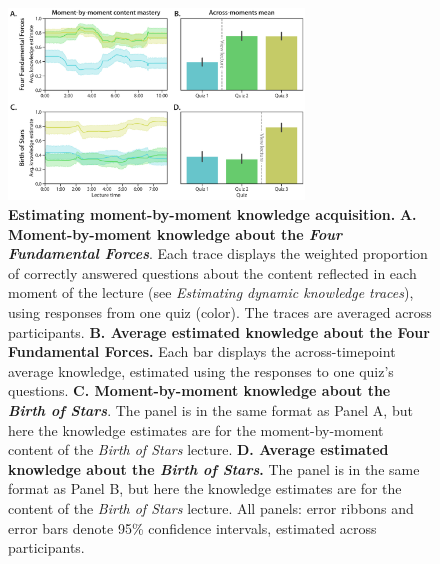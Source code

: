 \documentclass[10pt]{article}
\begin{document}
\begin{figure}[tp]
    \centering
    \includegraphics[width=0.7\textwidth]{figs/content-mastery}

    \caption{\textbf{Estimating moment-by-moment knowledge acquisition.}
    \textbf{A. Moment-by-moment knowledge about the \textit{Four Fundamental
    Forces}}. Each trace displays the weighted proportion of correctly answered
    questions about the content reflected in each moment of the lecture (see
    \textit{Estimating dynamic knowledge traces}), using responses from one
    quiz (color). The traces are averaged across participants. \textbf{B.
    Average estimated knowledge about the \textbf{Four Fundamental Forces}.}
    Each bar displays the across-timepoint average knowledge, estimated using
    the responses to one quiz's questions. \textbf{C. Moment-by-moment
    knowledge about the \textit{Birth of Stars}}. The panel is in the same
    format as Panel A, but here the knowledge estimates are for the
    moment-by-moment content of the \textit{Birth of Stars} lecture. \textbf{D.
    Average estimated knowledge about the \textit{Birth of Stars}.} The panel
    is in the same format as Panel B, but here the knowledge estimates are for
    the content of the \textit{Birth of Stars} lecture. All panels: error
    ribbons and error bars denote 95\% confidence intervals, estimated across
    participants.}

    \label{fig:knowledge-timeseries}
\end{figure}
\end{document}
